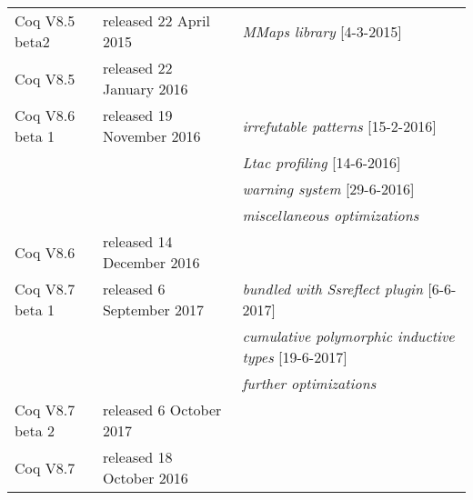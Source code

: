 \documentclass[a4paper]{book}
\newcommand{\feature}[1]{{\em #1}}
\begin{document}
\begin{tabular}{l|l|l}
Coq V8.5 beta2 & released 22 April 2015 & \feature{MMaps library} [4-3-2015]\\

Coq V8.5 & released 22 January 2016 & \\

Coq V8.6 beta 1 & released 19 November 2016 & \feature{irrefutable patterns} [15-2-2016]\\
&& \feature{Ltac profiling} [14-6-2016]\\
&& \feature{warning system} [29-6-2016]\\
&& \feature{miscellaneous optimizations}\\

Coq V8.6 & released 14 December 2016 & \\

Coq V8.7 beta 1 & released 6 September 2017 & \feature{bundled with Ssreflect plugin} [6-6-2017]\\
&& \feature{cumulative polymorphic inductive types} [19-6-2017]\\
&& \feature{further optimizations}\\

Coq V8.7 beta 2 & released 6 October 2017 & \\

Coq V8.7 & released 18 October 2016 & \\

\end{tabular}

\medskip
\bigskip
\newpage
\end{document}
